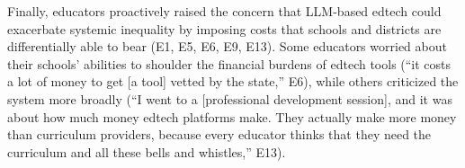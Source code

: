 \noindent Finally, educators proactively raised the concern that LLM-based edtech could exacerbate systemic inequality by imposing costs that schools and districts are differentially able to bear (E1, E5, E6, E9, E13). Some educators worried about their schools' abilities to shoulder the financial burdens of edtech tools (``it costs a lot of money to get [a tool] vetted by the state,'' E6), while others criticized the system more broadly (``I went to a [professional development session], and it was about how much money edtech platforms make. They actually make more money than curriculum providers, because every educator thinks that they need the curriculum and all these bells and whistles,'' E13).